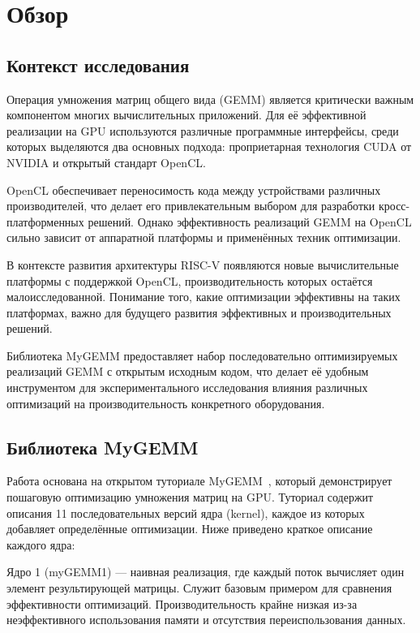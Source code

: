 
\section{Обзор}
\label{sec:relatedworks}

\subsection{Контекст исследования}

Операция умножения матриц общего вида (GEMM) является критически важным компонентом многих вычислительных приложений. Для её эффективной реализации на GPU используются различные программные интерфейсы, среди которых выделяются два основных подхода: проприетарная технология CUDA от NVIDIA и открытый стандарт OpenCL.

OpenCL обеспечивает переносимость кода между устройствами различных производителей, что делает его привлекательным выбором для разработки кросс-платформенных решений. Однако эффективность реализаций GEMM на OpenCL сильно зависит от аппаратной платформы и применённых техник оптимизации.

В контексте развития архитектуры RISC-V появляются новые вычислительные платформы с поддержкой OpenCL, производительность которых остаётся малоисследованной. Понимание того, какие оптимизации эффективны на таких платформах, важно для будущего развития эффективных и производительных решений.

Библиотека MyGEMM предоставляет набор последовательно оптимизируемых реализаций GEMM с открытым исходным кодом, что делает её удобным инструментом для экспериментального исследования влияния различных оптимизаций на производительность конкретного оборудования.

\subsection{Библиотека MyGEMM}

Работа основана на открытом туториале MyGEMM~\cite{nugteren2018mygemm}, который демонстрирует пошаговую оптимизацию умножения матриц на GPU. Туториал содержит описания 11 последовательных версий ядра (kernel), каждое из которых добавляет определённые оптимизации. Ниже приведено краткое описание каждого ядра:

Ядро 1 (myGEMM1) --- наивная реализация, где каждый поток вычисляет один элемент результирующей матрицы. Служит базовым примером для сравнения эффективности оптимизаций. Производительность крайне низкая из-за неэффективного использования памяти и отсутствия переиспользования данных.

